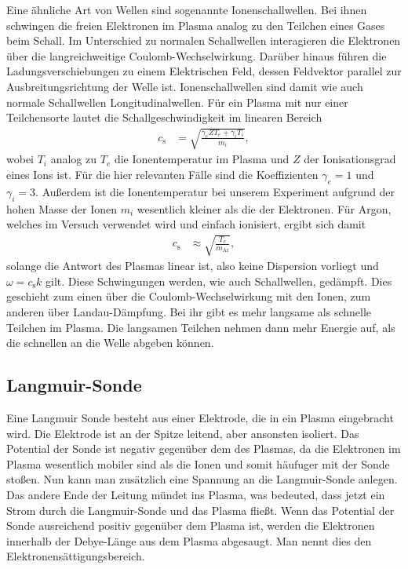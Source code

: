 Eine \"ahnliche Art von Wellen sind sogenannte Ionenschallwellen.
Bei ihnen schwingen die freien Elektronen im Plasma analog zu den Teilchen eines Gases beim Schall.
Im Unterschied zu normalen Schallwellen interagieren die Elektronen \"uber die langreichweitige Coulomb-Wechselwirkung.
Dar\"uber hinaus f\"uhren die Ladungsverschiebungen zu einem Elektrischen Feld, dessen Feldvektor parallel zur Ausbreitungsrichtung der Welle ist.
Ionenschallwellen sind damit wie auch normale Schallwellen Longitudinalwellen.
\cite{schwabedissen99a}
F\"ur ein Plasma mit nur einer Teilchensorte lautet die Schallgeschwindigkeit im linearen Bereich
\begin{align}
c_\text{s}
    &=\sqrt{\frac{\gamma_eZT_e+\gamma_iT_i}{m_i}},
    \label{eq:cs1}
\end{align}
wobei $T_i$ analog zu $T_e$ die Ionentemperatur im Plasma und $Z$ der Ionisationsgrad eines Ions ist.
F\"ur die hier relevanten F\"alle sind die Koeffizienten $\gamma_e=1$ und $\gamma_i=3$.
Au\ss erdem ist die Ionentemperatur bei unserem Experiment aufgrund der hohen Masse der Ionen $m_i$ wesentlich kleiner als die der Elektronen.
F\"ur Argon, welches im Versuch verwendet wird und einfach ionisiert, ergibt sich damit
\begin{align}
c_\text{s}
    &\approx\sqrt{\frac{T_e}{m_\text{Ar}}},
    \label{eq:cs2}
\end{align}
solange die Antwort des Plasmas linear ist, also keine Dispersion vorliegt und $\omega=c_\text{s}k$ gilt.
Diese Schwingungen werden, wie auch Schallwellen, ged\"ampft.
Dies geschieht zum einen \"uber die Coulomb-Wechselwirkung mit den Ionen, zum anderen \"uber Landau-D\"ampfung.
\cite{wiki:IAwaves}
Bei ihr gibt es mehr langsame als schnelle Teilchen im Plasma.
Die langsamen Teilchen nehmen dann mehr Energie auf, als die schnellen an die Welle abgeben k\"onnen.
\cite{wiki:Landau}

\subsection{Langmuir-Sonde}
Eine Langmuir Sonde besteht aus einer Elektrode, die in ein Plasma eingebracht wird.
Die Elektrode ist an der Spitze leitend, aber ansonsten isoliert.
Das Potential der Sonde ist negativ gegen\"uber dem des Plasmas, da die Elektronen im Plasma wesentlich mobiler sind als die Ionen und somit h\"aufuger mit der Sonde stoßen.
Nun kann man zus\"atzlich eine Spannung an die Langmuir-Sonde anlegen.
Das andere Ende der Leitung m\"undet ins Plasma, was bedeuted, dass jetzt ein Strom durch die Langmuir-Sonde und das Plasma flie\ss t.
Wenn das Potential der Sonde ausreichend positiv gegen\"uber dem Plasma ist, werden die Elektronen innerhalb der Debye-L\"ange aus dem Plasma abgesaugt.
Man nennt dies den Elektronens\"attigungsbereich.
\cite{anleitung1}

